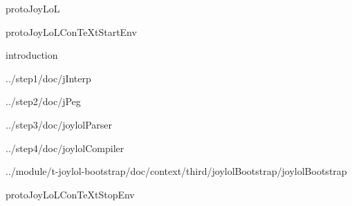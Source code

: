 
\usemodule[t-diSimp]

\startDiSimpComponent protoJoyLoL

\diSimpEnvironment protoJoyLoLConTeXtStartEnv

\diSimpComponent introduction

\diSimpComponent ../step1/doc/jInterp

\diSimpComponent ../step2/doc/jPeg

\diSimpComponent ../step3/doc/joylolParser

\diSimpComponent ../step4/doc/joylolCompiler

\diSimpComponent ../module/t-joylol-bootstrap/doc/context/third/joylolBootstrap/joylolBootstrap

\diSimpEnvironment protoJoyLoLConTeXtStopEnv

\stopDiSimpComponent
